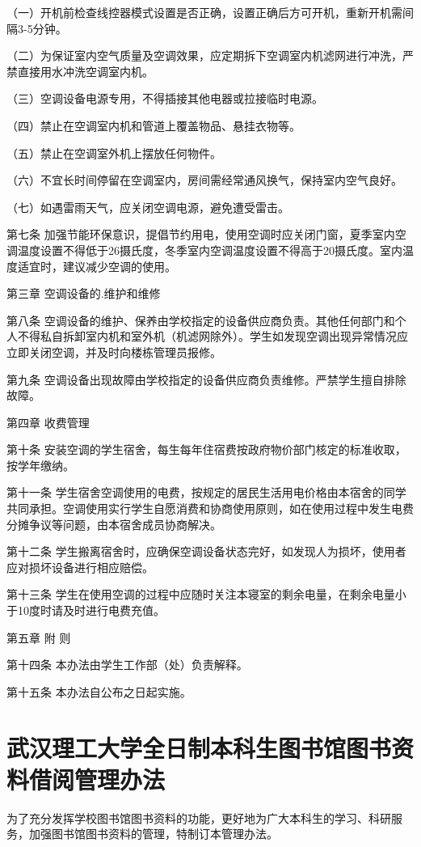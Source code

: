 \documentclass[UTF8,12pt,a4paper]{report}
\begin{document}
（一）开机前检查线控器模式设置是否正确，设置正确后方可开机，重新开机需间隔3-5分钟。

（二）为保证室内空气质量及空调效果，应定期拆下空调室内机滤网进行冲洗，严禁直接用水冲洗空调室内机。

（三）空调设备电源专用，不得插接其他电器或拉接临时电源。

（四）禁止在空调室内机和管道上覆盖物品、悬挂衣物等。

（五）禁止在空调室外机上摆放任何物件。

（六）不宜长时间停留在空调室内，房间需经常通风换气，保持室内空气良好。

（七）如遇雷雨天气，应关闭空调电源，避免遭受雷击。

第七条 加强节能环保意识，提倡节约用电，使用空调时应关闭门窗，夏季室内空调温度设置不得低于26摄氏度，冬季室内空调温度设置不得高于20摄氏度。室内温度适宜时，建议减少空调的使用。

第三章 空调设备的.维护和维修

第八条 空调设备的维护、保养由学校指定的设备供应商负责。其他任何部门和个人不得私自拆卸室内机和室外机（机滤网除外）。学生如发现空调出现异常情况应立即关闭空调，并及时向楼栋管理员报修。

第九条 空调设备出现故障由学校指定的设备供应商负责维修。严禁学生擅自排除故障。

第四章 收费管理

第十条 安装空调的学生宿舍，每生每年住宿费按政府物价部门核定的标准收取，按学年缴纳。

第十一条 学生宿舍空调使用的电费，按规定的居民生活用电价格由本宿舍的同学共同承担。空调使用实行学生自愿消费和协商使用原则，如在使用过程中发生电费分摊争议等问题，由本宿舍成员协商解决。

第十二条 学生搬离宿舍时，应确保空调设备状态完好，如发现人为损坏，使用者应对损坏设备进行相应赔偿。

第十三条 学生在使用空调的过程中应随时关注本寝室的剩余电量，在剩余电量小于10度时请及时进行电费充值。

第五章 附 则

第十四条 本办法由学生工作部（处）负责解释。

第十五条 本办法自公布之日起实施。

\chapter{武汉理工大学全日制本科生图书馆图书资料借阅管理办法}
为了充分发挥学校图书馆图书资料的功能，更好地为广大本科生的学习、科研服务，加强图书馆图书资料的管理，特制订本管理办法。
\end{document}
